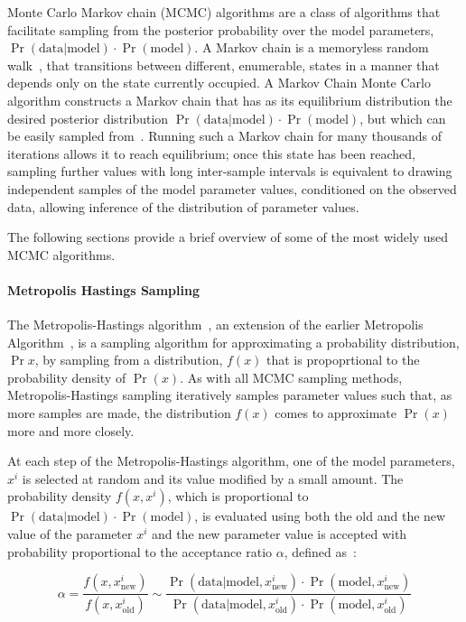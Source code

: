 Monte Carlo Markov chain (MCMC) algorithms are a class of algorithms that facilitate sampling from the posterior probability over the model parameters, $\Pr(\text{data}|\text{model}) \cdot \Pr(\text{model})$. A Markov chain is a memoryless random walk~\cite{Norris1998}, that transitions between different, enumerable, states in a manner that depends only on the state currently occupied. A Markov Chain Monte Carlo algorithm constructs a Markov chain that has as its equilibrium distribution the desired posterior distribution $\Pr(\text{data}|\text{model}) \cdot \Pr(\text{model})$, but which can be easily sampled from~\cite{Smith1993}. Running such a Markov chain for many thousands of iterations allows it to reach equilibrium; once this state has been reached, sampling further values with long inter-sample intervals is equivalent to drawing independent samples of the model parameter values, conditioned on the observed data, allowing inference of the distribution of parameter values. 

The following sections provide a brief overview of some of the most widely used MCMC algorithms.  

\paragraph{Metropolis Hastings Sampling}
The Metropolis-Hastings algorithm~\cite{hastings70}, an extension of the earlier Metropolis Algorithm~\cite{metropolis53}, is a sampling algorithm for approximating a probability distribution, $\Pr{x}$, by sampling from a distribution, $f(x)$ that is propoprtional to the probability density of $\Pr(x)$. As with all MCMC sampling methods, Metropolis-Hastings sampling iteratively samples parameter values such that, as more samples are made, the distribution $f(x)$ comes to approximate $\Pr(x)$ more and more closely. 

At each step of the Metropolis-Hastings algorithm, one of the model parameters, $x^i$ is selected at random and its value modified by a small amount. The probability density $f(x, x^i)$, which is proportional to $\Pr(\text{data}|\text{model}) \cdot \Pr(\text{model})$, is evaluated using both the old and the new value of the parameter $x^i$ and the new parameter value is accepted with probability proportional to the acceptance ratio $\alpha$, defined as~\cite{chib95, barberBRML2012}:

\begin{equation}
\alpha =  \frac{f(x, x^i_{\text{new}})}{f(x, x^i_{\text{old}})} \sim \frac{\Pr(\text{data}|\text{model}, x^i_{\text{new}}) \cdot \Pr(\text{model}, x^i_{\text{new}})}{\Pr(\text{data}|\text{model}, x^i_{\text{old}}) \cdot \Pr(\text{model}, x^i_{\text{old}})}
\label{eq:MH_alpha}
\end{equation}


